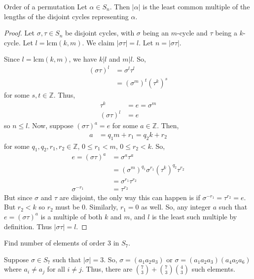 \documentclass[12pt]{article}
\newcommand{\Z}{\mathbb{Z}}
\begin{document}
	\begin{mythm}{Order of a permutation}{}
		Let $\alpha\in S_n$. Then $|\alpha|$ is the least common multiple of the lengths of the disjoint cycles representing $\alpha$.
		\begin{proof}
			Let $\sigma, \tau\in S_n$ be disjoint cycles, with $\sigma$ being an $m$-cycle and $\tau$ being a $k$-cycle. Let $l=\text{lcm}(k, m)$. We claim $|\sigma\tau|=l$. Let $n=|\sigma\tau|$.
			
			Since $l=\text{lcm}(k, m)$, we have $k|l$ and $m|l$. So,
			\begin{align*}
				(\sigma\tau)^l&=\sigma^l\tau^l\\
				&=(\sigma^m)^t(\tau^k)^s
			\end{align*}
			for some $s, t\in\Z$. Thus,
			\begin{align*}
				\tau^k&=e=\sigma^m\\
				(\sigma\tau)^l&=e
			\end{align*}
			so $n\leq l$. Now, suppose $(\sigma\tau)^a=e$ for some $a\in\Z$. Then,
			\begin{align*}
				a&=q_1m+r_1=q_2k+r_2
			\end{align*}
			for some $q_1, q_2, r_1, r_2\in\Z$, $0\leq r_1<m$, $0\leq r_2<k$. So,
			\begin{align*}
				e=(\sigma\tau)^a&=\sigma^a\tau^a\\
				&=(\sigma^m)^{q_1}\sigma^{r_1}(\tau^k)^{q_2}\tau^{r_2}\\
				&=\sigma^{r_1}\tau^{r_2}\\
				\sigma^{-r_1}&=\tau^{r_2}
			\end{align*}
			But since $\sigma$ and $\tau$ are disjoint, the only way this can happen is if $\sigma^{-r_1}=\tau^{r_2}=e$. But $r_2<k$ so $r_2$ must be $0$. Similarly, $r_1=0$ as well. So, any integer $a$ such that $e=(\sigma\tau)^a$ is a multiple of both $k$ and $m$, and $l$ is the least such multiple by definition. Thus $|\sigma\tau|=l$.
		\end{proof}
	\end{mythm}
	
	\begin{myex}{}{}
		Find number of elements of order 3 in $S_7$.
		
		Suppose $\sigma\in S_7$ such that $|\sigma|=3$. So, $\sigma=(a_1a_2a_3)$ or $\sigma=(a_1a_2a_3)(a_4a_5a_6)$ where $a_i\neq a_j$ for all $i\neq j$. Thus, there are $\binom{7}{3}+\binom{7}{3}\binom{4}{3}$ such elements.
	\end{myex}
	
\end{document}
